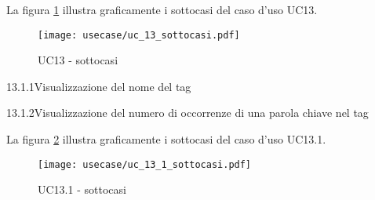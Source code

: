 \vspace{10pt}
\par\noindent
\begin{minipage}{\textwidth}
    La figura \ref{fig:uc13_sottocasi} illustra graficamente i sottocasi del caso d'uso UC13.
    \begin{figure}[H]
        \centering
        \texttt{[image: usecase/uc\_13\_sottocasi.pdf]}
        \caption{UC13 - sottocasi}
        \label{fig:uc13_sottocasi}
    \end{figure}
\end{minipage}

\begin{usecase}{13.1.1}{Visualizzazione del nome del tag}\label{UC13point1point1}
\end{usecase}

\begin{usecase}{13.1.2}{Visualizzazione del numero di occorrenze di una parola chiave nel tag}\label{UC13point1point2}
\end{usecase}

\vspace{10pt}
\par\noindent
\begin{minipage}{\textwidth}
    La figura \ref{fig:uc13_1_sottocasi} illustra graficamente i sottocasi del caso d'uso UC13.1.
    \begin{figure}[H]
        \centering
        \texttt{[image: usecase/uc\_13\_1\_sottocasi.pdf]}
        \caption{UC13.1 - sottocasi}
        \label{fig:uc13_1_sottocasi}
    \end{figure}
\end{minipage}

